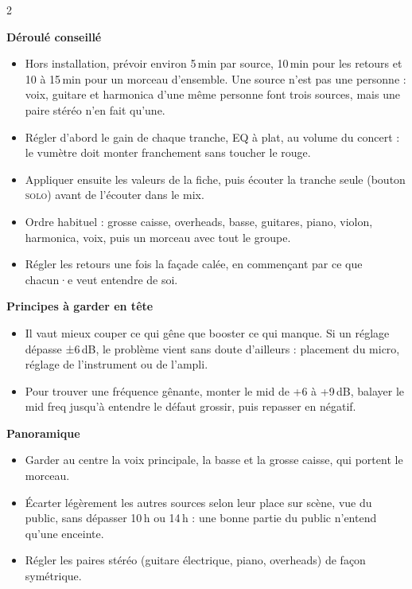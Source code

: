 \documentclass[9pt]{extarticle}
\begin{document}
\vspace{2mm}
\setlength{\columnsep}{9mm}
\raggedcolumns
\begin{multicols}{2}
\fontsize{9.5}{12.3}\selectfont

\textbf{Déroulé conseillé}
\begin{itemize}
  \item Hors installation, prévoir environ 5\,min par source, 10\,min pour les retours et 10 à 15\,min pour un morceau d'ensemble. Une source n'est pas une personne : voix, guitare et harmonica d'une même personne font trois sources, mais une paire stéréo n'en fait qu'une.
  \item Régler d'abord le gain de chaque tranche, EQ à plat, au volume du concert : le vumètre doit monter franchement sans toucher le rouge.
  \item Appliquer ensuite les valeurs de la fiche, puis écouter la tranche seule (bouton \textsc{solo}) avant de l'écouter dans le mix.
  \item Ordre habituel : grosse caisse, overheads, basse, guitares, piano, violon, harmonica, voix, puis un morceau avec tout le groupe.
  \item Régler les retours une fois la façade calée, en commençant par ce que chacun·e veut entendre de soi.
\end{itemize}

\textbf{Principes à garder en tête}
\begin{itemize}
  \item Il vaut mieux couper ce qui gêne que booster ce qui manque. Si un réglage dépasse ±6\,dB, le problème vient sans doute d'ailleurs : placement du micro, réglage de l'instrument ou de l'ampli.
  \item Pour trouver une fréquence gênante, monter le mid de +6 à +9\,dB, balayer le mid freq jusqu'à entendre le défaut grossir, puis repasser en négatif.
\end{itemize}

\textbf{Panoramique}
\begin{itemize}
  \item Garder au centre la voix principale, la basse et la grosse caisse, qui portent le morceau.
  \item Écarter légèrement les autres sources selon leur place sur scène, vue du public, sans dépasser 10\,h ou 14\,h : une bonne partie du public n'entend qu'une enceinte.
  \item Régler les paires stéréo (guitare électrique, piano, overheads) de façon symétrique.
\end{itemize}


\end{multicols}
\end{document}
